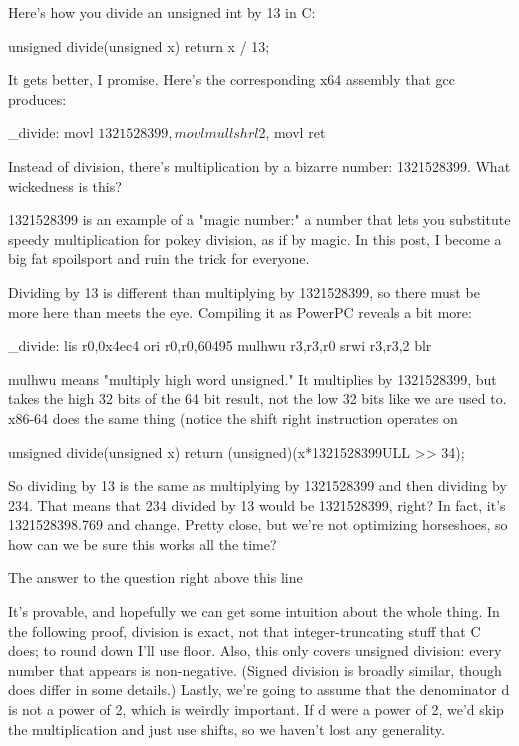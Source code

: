 
Here's how you divide an unsigned int by 13 in C:

unsigned divide(unsigned x) { return x / 13; }

It gets better, I promise. Here's the corresponding x64 assembly that gcc produces:

_divide:
        movl    $1321528399, %
        movl    %
        mull    %
        shrl    $2, %
        movl    %
        ret

Instead of division, there's multiplication by a bizarre number: 1321528399. What wickedness is this?

1321528399 is an example of a "magic number:" a number that lets you substitute speedy multiplication for pokey division, as if by magic. In this post, I become a big fat spoilsport and ruin the trick for everyone.

Dividing by 13 is different than multiplying by 1321528399, so there must be more here than meets the eye. Compiling it as PowerPC reveals a bit more:

_divide:
        lis r0,0x4ec4
        ori r0,r0,60495
        mulhwu r3,r3,r0
        srwi r3,r3,2
        blr

mulhwu means "multiply high word unsigned." It multiplies by 1321528399, but takes the high 32 bits of the 64 bit result, not the low 32 bits like we are used to. x86-64 does the same thing (notice the shift right instruction operates on %

unsigned divide(unsigned x) {
   return (unsigned)(x*1321528399ULL >> 34);
}

So dividing by 13 is the same as multiplying by 1321528399 and then dividing by 234. That means that 234 divided by 13 would be 1321528399, right? In fact, it's 1321528398.769 and change. Pretty close, but we're not optimizing horseshoes, so how can we be sure this works all the time?
 
The answer to the question right above this line

It's provable, and hopefully we can get some intuition about the whole thing. In the following proof, division is exact, not that integer-truncating stuff that C does; to round down I'll use floor. Also, this only covers unsigned division: every number that appears is non-negative. (Signed division is broadly similar, though does differ in some details.) Lastly, we're going to assume that the denominator d is not a power of 2, which is weirdly important. If d were a power of 2, we'd skip the multiplication and just use shifts, so we haven't lost any generality.

